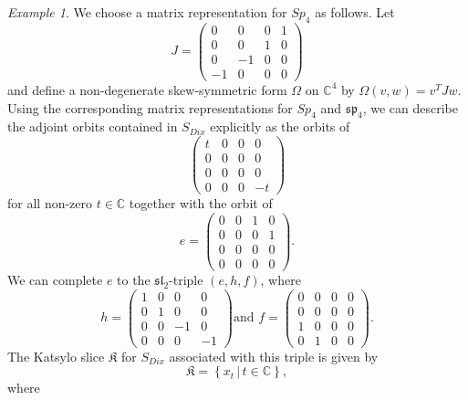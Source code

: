 \documentclass{amsart}
\theoremstyle{remark}
\newtheorem{example}[theorem]{Example}
\numberwithin{theorem}{section}
\numberwithin{equation}{section}
\begin{document}
\begin{example}
    We choose a matrix representation for $Sp_4$ as follows. Let
    $$J = \begin{pmatrix}
        0 & 0 & 0 & 1 \\
        0 & 0 & 1 & 0 \\
        0 & -1 & 0 & 0 \\
        -1 & 0 & 0 & 0
    \end{pmatrix}$$
    and define a non-degenerate skew-symmetric form $\Omega$ on $\mathbb{C}^4$ by $\Omega(v,w) = v^TJw$. Using the corresponding matrix representations for $Sp_4$ and $\mathfrak{sp}_4$, we can describe the adjoint orbits contained in $S_{Dix}$ explicitly as the orbits of
    $$\begin{pmatrix}
        t & 0 & 0 & 0 \\
        0 & 0 & 0 & 0 \\
        0 & 0 & 0 & 0 \\
        0 & 0 & 0 & -t
    \end{pmatrix}$$
    for all non-zero $t \in \mathbb{C}$ together with the orbit of
    $$e =\begin{pmatrix}
        0 & 0 & 1 & 0 \\
        0 & 0 & 0 & 1 \\
        0 & 0 & 0 & 0 \\
        0 & 0 & 0 & 0
    \end{pmatrix}.$$
    We can complete $e$ to the $\mathfrak{sl}_2$-triple $(e,h,f)$, where
    $$h = \begin{pmatrix}
        1 & 0 & 0 & 0\\
        0 & 1 & 0 & 0 \\
        0 & 0 & -1 & 0 \\
        0 & 0 & 0 & -1
    \end{pmatrix}
    \text{and }
    f = \begin{pmatrix}
        0 & 0 & 0 & 0 \\
        0 & 0 & 0 & 0 \\
        1 & 0 & 0 & 0 \\
        0 & 1 & 0 & 0
    \end{pmatrix}.$$
    The Katsylo slice $\mathfrak{K}$ for $S_{Dix}$ associated with this triple is given by
    \begin{equation}\label{Sp4Katsylo1eqn}
        \mathfrak{K} = \left\{ x_t \, |\,  t \in \mathbb{C} \right\},
    \end{equation}
    where
    \begin{equation}\label{Sp4Katsylo2eqn}

\end{equation}
\end{example}
\end{document}
